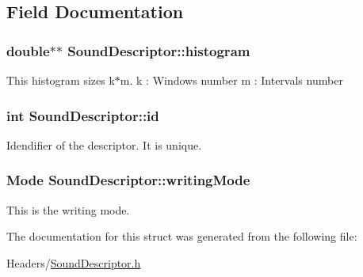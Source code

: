 \subsection{Field Documentation}
\hypertarget{structSoundDescriptor_a677e9fb3556058648bf4f114e81abc8f}{
\subsubsection[{histogram}]{\setlength{\rightskip}{0pt plus 5cm}double$\ast$$\ast$ Sound\-Descriptor\-::histogram}}\label{structSoundDescriptor_a677e9fb3556058648bf4f114e81abc8f}
This histogram sizes k$\ast$m. k \-: Windows number m \-: Intervals number \hypertarget{structSoundDescriptor_a0e74167c9c85b5696a4b64dd16af30c6}{
\subsubsection[{id}]{\setlength{\rightskip}{0pt plus 5cm}int Sound\-Descriptor\-::id}}\label{structSoundDescriptor_a0e74167c9c85b5696a4b64dd16af30c6}
Idendifier of the descriptor. It is unique. \hypertarget{structSoundDescriptor_a6bda0da57e7a82c0e7c20b22f26b6c1c}{
\subsubsection[{writing\-Mode}]{\setlength{\rightskip}{0pt plus 5cm}Mode Sound\-Descriptor\-::writing\-Mode}}\label{structSoundDescriptor_a6bda0da57e7a82c0e7c20b22f26b6c1c}
This is the writing mode. 

The documentation for this struct was generated from the following file\-:\begin{DoxyCompactItemize}
\item 
Headers/\hyperlink{SoundDescriptor_8h}{Sound\-Descriptor.\-h}\end{DoxyCompactItemize}
